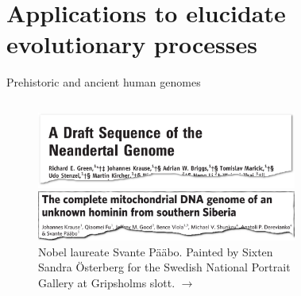 \documentclass[10pt]{beamer}
\begin{document}

\section{Applications to elucidate evolutionary processes}


\begin{frame}{Prehistoric and ancient human genomes}
\begin{columns}
\begin{figure}
	\includegraphics[width=\textwidth]{./figures/paper-green.png} \par
	\includegraphics[width=\textwidth]{./figures/paper-krause.png}
	\caption{Nobel laureate Svante Pääbo. Painted by Sixten Sandra Österberg for the Swedish National Portrait Gallery at Gripsholms slott. $\rightarrow$}
\end{figure}
\begin{figure}

\end{figure}
\end{columns}
\end{frame}
\end{document}
